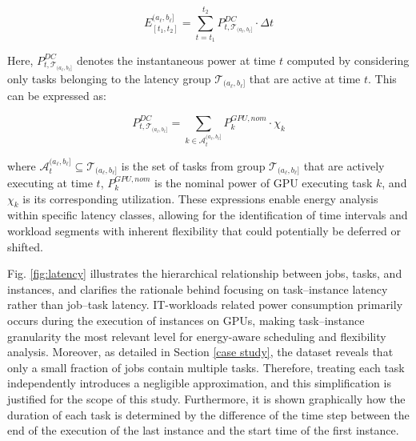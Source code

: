 \documentclass[preprint,12pt]{elsarticle}
\begin{document}
\begin{equation}
E^{(a_\ell, b_\ell]}_{[t_1, t_2]} = \sum_{t = t_1}^{t_2} P^{DC}_{t, \mathcal{T}_{(a_\ell, b_\ell]}} \cdot \Delta t
\label{eq:energy_group}
\end{equation}

Here, $P^{DC}_{t, \mathcal{T}_{(a_\ell, b_\ell]}}$ denotes the instantaneous power at time $t$ computed by considering only tasks belonging to the latency group $\mathcal{T}_{(a_\ell, b_\ell]}$ that are active at time $t$. This can be expressed as:

\begin{equation}
P^{DC}_{t, \mathcal{T}_{(a_\ell, b_\ell]}} = \sum_{k \in \mathcal{A}_{t}^{(a_\ell, b_\ell]}} P^{GPU, nom}_k \cdot \chi_k
\label{eq:power_group}
\end{equation}

where $\mathcal{A}_{t}^{(a_\ell, b_\ell]} \subseteq \mathcal{T}_{(a_\ell, b_\ell]}$ is the set of tasks from group $\mathcal{T}_{(a_\ell, b_\ell]}$ that are actively executing at time $t$, $P^{GPU, nom}_k$ is the nominal power of GPU executing task $k$, and $\chi_k$ is its corresponding utilization. These expressions enable energy analysis within specific latency classes, allowing for the identification of time intervals and workload segments with inherent flexibility that could potentially be deferred or shifted. 

Fig. \ref{fig:latency} illustrates the hierarchical relationship between jobs, tasks, and instances, and clarifies the rationale behind focusing on task–instance latency rather than job–task latency. IT-workloads related power consumption primarily occurs during the execution of instances on GPUs, making task–instance granularity the most relevant level for energy-aware scheduling and flexibility analysis. Moreover, as detailed in Section \ref{case study}, the dataset reveals that only a small fraction of jobs contain multiple tasks. Therefore, treating each task independently introduces a negligible approximation, and this simplification is justified for the scope of this study. Furthermore, it is shown graphically how the duration of each task is determined by the difference of the time step between the end of the execution of the last instance and the start time of the first instance. 


\end{document}

